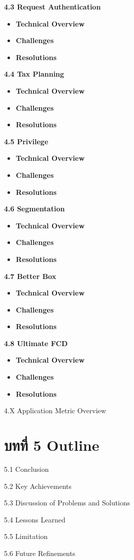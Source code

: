 \textbf{4.3 Request Authentication}

\begin{itemize}
\item
  \textbf{Technical Overview}
\item
  \textbf{Challenges}
\item
  \textbf{Resolutions}
\end{itemize}

\textbf{4.4 Tax Planning}

\begin{itemize}
\item
  \textbf{Technical Overview}
\item
  \textbf{Challenges}
\item
  \textbf{Resolutions}
\end{itemize}

\textbf{4.5 Privilege}

\begin{itemize}
\item
  \textbf{Technical Overview}
\item
  \textbf{Challenges}
\item
  \textbf{Resolutions}
\end{itemize}

\textbf{4.6 Segmentation}

\begin{itemize}
\item
  \textbf{Technical Overview}
\item
  \textbf{Challenges}
\item
  \textbf{Resolutions}
\end{itemize}

\textbf{4.7 Better Box}

\begin{itemize}
\item
  \textbf{Technical Overview}
\item
  \textbf{Challenges}
\item
  \textbf{Resolutions}
\end{itemize}

\textbf{4.8 Ultimate FCD}

\begin{itemize}
\item
  \textbf{Technical Overview}
\item
  \textbf{Challenges}
\item
  \textbf{Resolutions}
\end{itemize}

4.X Application Metric Overview

\section{\texorpdfstring{\textbf{บทที่ 5 Outline}
}{บทที่ 5 Outline }}\label{uxe1auxe17uxe17-5-outline}

5.1 Conclusion

5.2 Key Achievements

5.3 Discussion of Problems and Solutions

5.4 Lessons Learned

5.5 Limitation

5.6 Future Refinements
